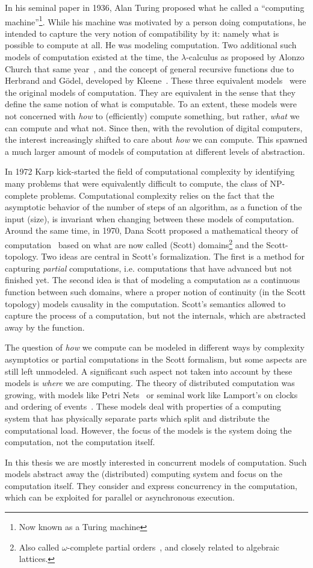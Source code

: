 In his seminal paper in 1936, Alan Turing proposed what he called a ``computing machine''\footnote{Now known as a Turing machine}.   
While his machine was motivated by a person doing computations, he intended to capture the very notion of compatibility by it: namely what is possible to compute at all.
He was modeling computation.
Two additional such models of computation existed at the time, the $\lambda$-calculus as proposed by Alonzo Church that same year~\cite{church1936unsolvable}, and the concept of general recursive functions due to Herbrand and Gödel, developed by Kleene~\cite{kleene1936recursive}.
These three equivalent models~\cite{turing1937computability} were the original models of computation.
They are equivalent in the sense that they define the same notion of what is computable.
To an extent, these models were not concerned with \emph{how} to (efficiently) compute something, but rather, \emph{what} we can compute and what not.
Since then, with the revolution of digital computers, the interest increasingly shifted to care about \emph{how} we can compute.
This spawned a much larger amount of models of computation at different levels of abstraction.

In 1972 Karp\cite{karp1972reducibility} kick-started the field of computational complexity by identifying many problems that were equivalently difficult to compute, the class of NP-complete problems.
Computational complexity relies on the fact that the asymptotic behavior of the number of steps of an algorithm, as a function of the input (size), is invariant when changing between these models of computation.
Around the same time, in 1970, Dana Scott proposed a mathematical theory of computation~\cite{scott1970} based on what are now called (Scott) domains\footnote{Also called $\omega$-complete partial orders~\cite{gunter}, and closely related to algebraic lattices.} and the Scott-topology. 
Two ideas are central in Scott's formalization. The first is a method for capturing \emph{partial} computations, i.e. computations that have advanced but not finished yet.
The second idea is that of modeling a computation as a continuous function between such domains, where a proper notion of continuity (in the Scott topology) models causality in the computation.
Scott's semantics allowed to capture the process of a computation, but not the internals, which are abstracted away by the function. 

The question of \emph{how} we compute can be modeled in different ways by complexity asymptotics or partial computations in the Scott formalism, but some aspects are still left unmodeled.
A significant such aspect not taken into account by these models is \emph{where} we are computing.
The theory of distributed computation was growing, with models like Petri Nets~\cite{petri1962nets} or seminal work like Lamport's on clocks and ordering of events~\cite{Lamport78time}.
These models deal with properties of a computing system that has physically separate parts which split and distribute the computational load.
However, the focus of the models is the system doing the computation, not the computation itself.

In this thesis we are mostly interested in concurrent models of computation. 
Such models abstract away the (distributed) computing system and focus on the computation itself. 
They consider and express concurrency in the computation, which can be exploited for parallel or asynchronous execution.

